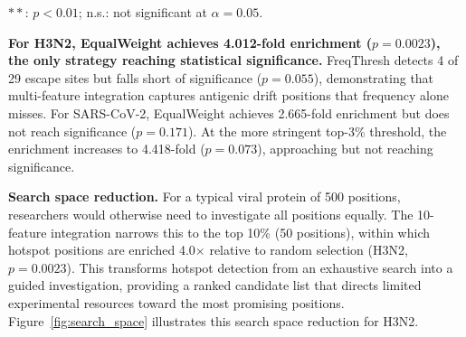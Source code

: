 \begin{table}[htbp]
\centering
\caption{Vaccine escape position validation (top-5\% threshold). Enrichment is the ratio of observed to expected overlap under random assignment. $p$-values from Fisher's exact test.}
\label{tab:adapt_escape}
\begin{minipage}{\textwidth}
\smallskip
\footnotesize $**$: $p < 0.01$; n.s.: not significant at $\alpha = 0.05$.
\end{minipage}
\end{table}

\textbf{For H3N2, EqualWeight achieves 4.012-fold enrichment ($p = 0.0023$), the only strategy reaching statistical significance.}
FreqThresh detects 4 of 29 escape sites but falls short of significance ($p = 0.055$), demonstrating that multi-feature integration captures antigenic drift positions that frequency alone misses.
For SARS-CoV-2, EqualWeight achieves 2.665-fold enrichment but does not reach significance ($p = 0.171$). At the more stringent top-3\% threshold, the enrichment increases to 4.418-fold ($p = 0.073$), approaching but not reaching significance.

\textbf{Search space reduction.}
For a typical viral protein of 500 positions, researchers would otherwise need to investigate all positions equally.
The 10-feature integration narrows this to the top 10\% (50 positions), within which hotspot positions are enriched 4.0$\times$ relative to random selection (H3N2, $p = 0.0023$).
This transforms hotspot detection from an exhaustive search into a guided investigation, providing a ranked candidate list that directs limited experimental resources toward the most promising positions.
Figure~\ref{fig:search_space} illustrates this search space reduction for H3N2.

